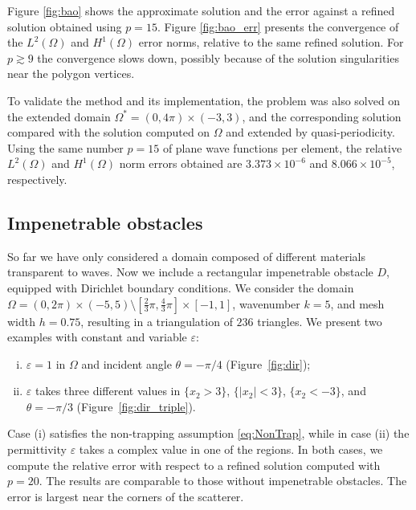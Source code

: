\documentclass[a4paper,10pt]{article}
\begin{document}
Figure \ref{fig:bao} shows the approximate solution and the error against a refined solution obtained using $p = 15$. %
Figure \ref{fig:bao_err} presents the convergence of the $L^2(\Omega)$ and $H^1(\Omega)$ error norms, relative to the same refined solution.
For $p\gtrsim 9$ the convergence slows down, possibly because of the solution singularities near the polygon vertices.



To validate the method and its implementation, the problem was also solved on the extended domain $\Omega^* = (0, 4\pi) \times (-3, 3)$, and the corresponding solution compared with the solution computed on $\Omega$ and extended by quasi-periodicity.
Using the same number $p=15$ of plane wave functions per element, the relative $L^2(\Omega)$ and $H^1(\Omega)$ norm errors obtained are $3.373 \times 10^{-6}$ and $8.066 \times 10^{-5}$, respectively.


\subsection{Impenetrable obstacles} \label{s:dir}
So far we have only considered a domain composed of different materials transparent to waves.
Now we include a rectangular impenetrable obstacle $D$, equipped with 
Dirichlet boundary conditions.
We consider the domain $\Omega = (0,2\pi) \times (-5,5) \setminus [\frac{2}{3}\pi, \frac{4}{3}\pi] \times [-1,1]$, wavenumber $k=5$, and mesh width $h=0.75$, resulting in a triangulation of $236$ triangles.
We present two examples with constant and variable $\varepsilon$:
\begin{enumerate}[(i)]
\item $\varepsilon=1$ in $\Omega$ and incident angle $\theta=-\pi/4$ (Figure~\ref{fig:dir});
\item $\varepsilon$ takes three different values in $\{x_2>3\}$, $\{|x_2|<3\}$, $\{x_2<-3\}$, and $\theta=-\pi/3$ (Figure~\ref{fig:dir_triple}).
\end{enumerate}
Case (i) satisfies the non-trapping assumption \eqref{eq:NonTrap}, while in case (ii) the permittivity $\varepsilon$ takes a complex value in one of the regions.
In both cases, we compute the relative error with respect to a refined solution computed with $p=20$.
The results are comparable to those without impenetrable obstacles.
The error is largest near the corners of the scatterer.
\end{document}
